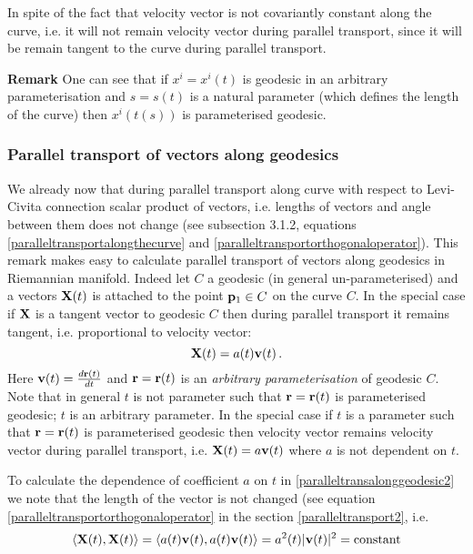 \documentclass[12pt]{article}
\theoremstyle{theorem}
\numberwithin{equation}{section}
\begin{document}
In spite of the fact that velocity vector is not covariantly constant along the curve,
i.e. it will not remain velocity vector during parallel transport, since
it will be remain tangent to the curve during parallel transport.




{\footnotesize
{\bf Remark} One can see
that if $x^i=x^i(t)$ is geodesic in
 an arbitrary parameterisation and
$s=s(t)$ is a natural parameter (which defines the length of the curve) then
$x^i(t(s))$ is parameterised geodesic.
}

\subsubsection {Parallel transport of vectors along geodesics}

We already now that during parallel transport along curve with respect to Levi-Civita connection
scalar product of vectors, i.e. lengths of vectors and angle between them does not change
(see subsection 3.1.2, equations
\eqref{paralleltransportalongthecurve}
and \eqref{paralleltransportorthogonaloperator}). 
This remark makes easy to calculate parallel transport
of vectors along geodesics in Riemannian manifold. Indeed let $C$ a geodesic (in general un-parameterised)
and a vectors ${\bf X}(t)$ is attached to the point ${\bf p}_1\in C$ on the curve $C$.   In the special case if ${\bf X}$
is a tangent vector to geodesic $C$ then during parallel transport it remains tangent, i.e. proportional
to velocity vector:
                   \begin{equation}\label{paralleltransalonggeodesic2}
                    {\bf X}(t)=a(t){\bf v}(t)\,.
                    \end{equation}
                   Here ${\bf v}(t)={d{\bf r}(t)\over dt}$ and ${\bf r}={\bf r}(t)$ is
                   an {\it arbitrary parameterisation} of geodesic $C$.
Note that in general $t$ is not parameter such that ${\bf r}={\bf r}(t)$ is parameterised geodesic; $t$
is an arbitrary parameter. In the special case if $t$ is a parameter such that ${\bf r}={\bf r}(t)$
is parameterised geodesic then velocity vector remains velocity vector during parallel transport,
i.e.  ${\bf X}(t)=a{\bf v}(t)$ where $a$ is not dependent on $t$.

To calculate  the dependence of coefficient $a$ on $t$ 
in \eqref{paralleltransalonggeodesic2}
we note that the length of the vector is not changed 
(see equation \eqref{paralleltransportorthogonaloperator} 
in the section \ref{paralleltransport2},
i.e.
             \begin{equation}\label{paralleltransalonggeodesic2}
\langle{\bf X}(t),{\bf X}(t)\rangle=\langle a(t){\bf v}(t),a(t){\bf v}(t)\rangle=a^2(t)|{\bf v}(t)|^2 ={\rm constant }
                    \end{equation}
\end{document}
